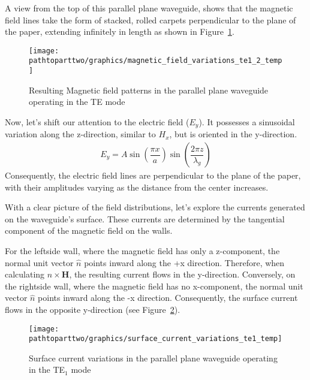 A view from the top of this parallel plane waveguide, shows that the magnetic field lines take the form of stacked, rolled carpets perpendicular to the plane of the paper, extending infinitely in length as shown in Figure~\ref{fig:magnetic_field_variation}.
\begin{figure}[h]
\centering
\texttt{[image: \\pathtoparttwo/graphics/magnetic\_field\_variations\_te1\_2\_temp]}
\caption{Resulting Magnetic field patterns in the parallel plane waveguide operating in the TE mode}
\label{fig:magnetic_field_variation}
\end{figure}

Now, let's shift our attention to the electric field ($E_y$). It possesses a sinusoidal variation along the z-direction, similar to $H_x$, but is oriented in the y-direction.
\begin{align*}
E_y= A\sin(\dfrac{\pi x}{a})\sin(\dfrac{2\pi z}{\lambda_g})
\end{align*}
Consequently, the electric field lines are perpendicular to the plane of the paper, with their amplitudes varying as the distance from the center increases.

With a clear picture of the field distributions, let's explore the currents generated on the waveguide's surface. These currents are determined by the tangential component of the magnetic field on the walls.

For the leftside wall, where the magnetic field has only a z-component, the normal unit vector $\hat{n}$ points inward along the +x direction. Therefore, when calculating $\hat{n} \times \boldsymbol{H}$, the resulting current flows in the y-direction. Conversely, on the rightside wall, where the magnetic field has no x-component, the normal unit vector $\hat{n}$ points inward along the -x direction. Consequently, the surface current flows in the opposite y-direction (see Figure~\ref{fig:surface_current_variation}).
\begin{figure}[h]
\centering
\texttt{[image: \\pathtoparttwo/graphics/surface\_current\_variations\_te1\_temp]}
\caption{Surface current variations in the parallel plane waveguide operating in the TE$_1$ mode}
\label{fig:surface_current_variation}
\end{figure}

